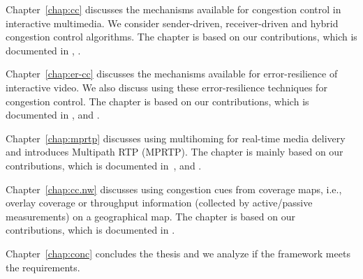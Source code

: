 
Chapter~\ref{chap:cc} discusses the mechanisms available for congestion
control in interactive multimedia. We consider sender-driven, receiver-driven
and hybrid congestion control algorithms. The chapter is based on our
contributions, which is documented in , .


Chapter~\ref{chap:er-cc} discusses the mechanisms available for
error-resilience of interactive video. We also discuss using these
error-resilience techniques for congestion control. The chapter is based on
our contributions, which is documented in , and
.



Chapter~\ref{chap:mprtp} discusses using multihoming for real-time media
delivery and introduces Multipath RTP (MPRTP). The chapter is mainly based on
our contributions, which is documented in~\cite{draft.mprtp, draft.mprtp.sdp,
Globisch:AsymGrpComm, draft.rtcp.overlay}, and .


Chapter~\ref{chap:cc.nw} discusses using congestion cues from coverage maps,
i.e., overlay coverage or throughput information (collected by active/passive
measurements) on a geographical map. The chapter is based on our
contributions, which is documented in .


Chapter~\ref{chap:conc} concludes the thesis and we analyze if the framework
meets the requirements.
